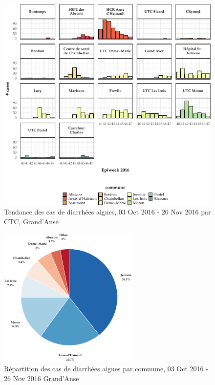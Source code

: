 \documentclass[]{tufte-handout}
\begin{document}
\begin{figure}
\includegraphics{rapport_final_files/figure-latex/epicurve_inst-1} \caption[Tendance des cas de diarrhées aigues, 03 Oct 2016 - 26 Nov 2016 par CTC, Grand’Anse]{Tendance des cas de diarrhées aigues, 03 Oct 2016 - 26 Nov 2016 par CTC, Grand’Anse}\label{fig:epicurve_inst}
\end{figure}

\clearpage

\begin{figure}
\includegraphics{rapport_final_files/figure-latex/pie-1} \caption[Répartition des cas de diarrhées aigues par commune, 03 Oct 2016 - 26 Nov 2016 Grand’Anse]{Répartition des cas de diarrhées aigues par commune, 03 Oct 2016 - 26 Nov 2016 Grand’Anse}\label{fig:pie}
\end{figure}
\end{document}
